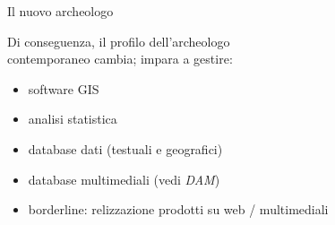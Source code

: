 \documentclass{beamer}
\begin{document}
        {
            \begin{frame}{Il nuovo archeologo}
                \colorbox{yellow!20}{
                    \begin{minipage}[t]{\paperwidth}
                        Di conseguenza, il profilo dell'archeologo\\contemporaneo cambia; impara a gestire:
                        \begin{itemize}
                            \item software GIS
                            \item analisi statistica
                            \item database dati (testuali e geografici)
                            \item database multimediali (vedi \emph{DAM})
                            \item borderline: relizzazione prodotti su web / multimediali
                        \end{itemize}
                    \end{minipage}
                }
            \end{frame}
        }
\end{document}
